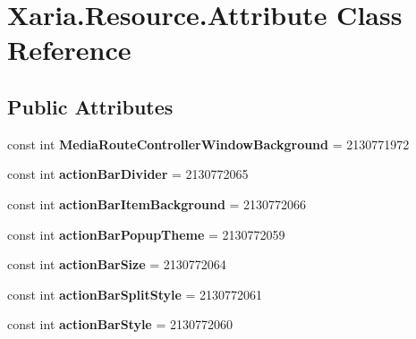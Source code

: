 \hypertarget{classXaria_1_1Resource_1_1Attribute}{}\section{Xaria.\+Resource.\+Attribute Class Reference}
\label{classXaria_1_1Resource_1_1Attribute}
\subsection*{Public Attributes}
\begin{DoxyCompactItemize}
\item 
\mbox{\label{classXaria_1_1Resource_1_1Attribute_aabf6166f98e10b3182337515e8f0f570}} 
const int {\bfseries Media\+Route\+Controller\+Window\+Background} = 2130771972
\item 
\mbox{\label{classXaria_1_1Resource_1_1Attribute_af83012dc0f716c9f215d63b4fd9f7012}} 
const int {\bfseries action\+Bar\+Divider} = 2130772065
\item 
\mbox{\label{classXaria_1_1Resource_1_1Attribute_a12f1c6df5b750ed16025e60df2dc432c}} 
const int {\bfseries action\+Bar\+Item\+Background} = 2130772066
\item 
\mbox{\label{classXaria_1_1Resource_1_1Attribute_a76902f1c9e0f8ecbab91176d227d41dd}} 
const int {\bfseries action\+Bar\+Popup\+Theme} = 2130772059
\item 
\mbox{\label{classXaria_1_1Resource_1_1Attribute_aeb236f5202dac76baa92d9497f6faaed}} 
const int {\bfseries action\+Bar\+Size} = 2130772064
\item 
\mbox{\label{classXaria_1_1Resource_1_1Attribute_aba8a3e72c2bcd4f54ffaaca61a3d3728}} 
const int {\bfseries action\+Bar\+Split\+Style} = 2130772061
\item 
\mbox{\label{classXaria_1_1Resource_1_1Attribute_a4fc7121d98dc3c80e7baee398073d727}} 
const int {\bfseries action\+Bar\+Style} = 2130772060
\item 

\end{DoxyCompactItemize}
